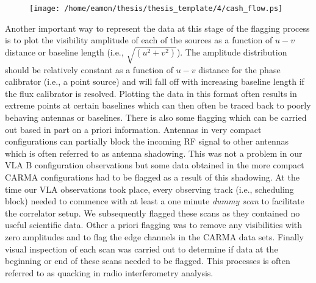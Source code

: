 \begin{figure}[hbt!]
\centering 
\texttt{[image: /home/eamon/thesis/thesis\_template/4/cash\_flow.ps]}  
\caption[]{}
\label{fig:4.2}
\end{figure}

Another important way to represent the data at this stage of the flagging process is to plot the visibility amplitude of each of the sources as a function of $u-v$ distance or baseline length (i.e., $\sqrt{(u^2 + v^2)}$). The amplitude distribution should be relatively constant as a function of $u-v$ distance for the phase calibrator (i.e., a point source) and will fall off with increasing baseline length if the flux calibrator is resolved. Plotting the data in this format often results in extreme points at certain baselines which can then often be traced back to poorly behaving antennas or baselines. There is also some flagging which can be carried out based in part on a priori information. Antennas in very compact configurations can partially block the incoming RF signal to other antennas which is often referred to as antenna shadowing. This was not a problem in our VLA B configuration observations but some data obtained in the more compact CARMA configurations had to be flagged as a result of this shadowing. At the time our VLA observations took place, every observing track (i.e., scheduling block) needed to commence with at least a one minute \textit{dummy scan} to facilitate the correlator setup. We subsequently flagged these scans as they contained no useful scientific data. Other a priori flagging was to remove any visibilities with zero amplitudes and to flag the edge channels in the CARMA data sets. Finally visual inspection of each scan was carried out to determine if data at the beginning or end of these scans needed to be flagged. This processes is often referred to as quacking in radio interferometry analysis.

